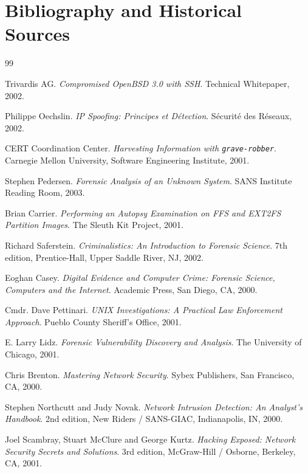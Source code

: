 \chapter*{Bibliography and Historical Sources}

\begin{thebibliography}{99}

Trivardis AG. \emph{Compromised OpenBSD 3.0 with SSH}. Technical Whitepaper, 2002.

Philippe Oechslin. \emph{IP Spoofing: Principes et Détection}. Sécurité des Réseaux, 2002.

CERT Coordination Center. \emph{Harvesting Information with \texttt{grave-robber}}. Carnegie Mellon University, Software Engineering Institute, 2001.

Stephen Pedersen. \emph{Forensic Analysis of an Unknown System}. SANS Institute Reading Room, 2003.

Brian Carrier. \emph{Performing an Autopsy Examination on FFS and EXT2FS Partition Images}. The Sleuth Kit Project, 2001.

Richard Saferstein. \emph{Criminalistics: An Introduction to Forensic Science}. 7th edition, Prentice-Hall, Upper Saddle River, NJ, 2002.

Eoghan Casey. \emph{Digital Evidence and Computer Crime: Forensic Science, Computers and the Internet}. Academic Press, San Diego, CA, 2000.

Cmdr. Dave Pettinari. \emph{UNIX Investigations: A Practical Law Enforcement Approach}. Pueblo County Sheriff's Office, 2001.

E. Larry Lidz. \emph{Forensic Vulnerability Discovery and Analysis}. The University of Chicago, 2001.

Chris Brenton. \emph{Mastering Network Security}. Sybex Publishers, San Francisco, CA, 2000.

Stephen Northcutt and Judy Novak. \emph{Network Intrusion Detection: An Analyst's Handbook}. 2nd edition, New Riders / SANS-GIAC, Indianapolis, IN, 2000.

Joel Scambray, Stuart McClure and George Kurtz. \emph{Hacking Exposed: Network Security Secrets and Solutions}. 3rd edition, McGraw-Hill / Osborne, Berkeley, CA, 2001.

\end{thebibliography}

